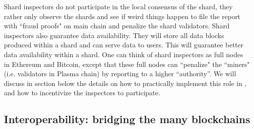 Shard inspectors do not participate in the local consensus of the shard, they rather only observe the shards and see if weird things happen to file the report with ``fraud proofs" on main chain and penalize the shard validators.
Shard inspectors also guarantee data availability. They will store all data blocks produced within a shard and can serve data to users. This will guarantee better data availability within a shard.
One can think of shard inspectors as full nodes in Ethereum and Bitcoin, except that these full nodes can ``penalize" the ``miners" (i.e. validators in Plasma chain) by reporting to a higher “authority”. We will discuss in section below the details on how to practically implement this role in \codename, and how to incentivize the inspectors to participate.

\subsection{Interoperability: bridging the many blockchains}

